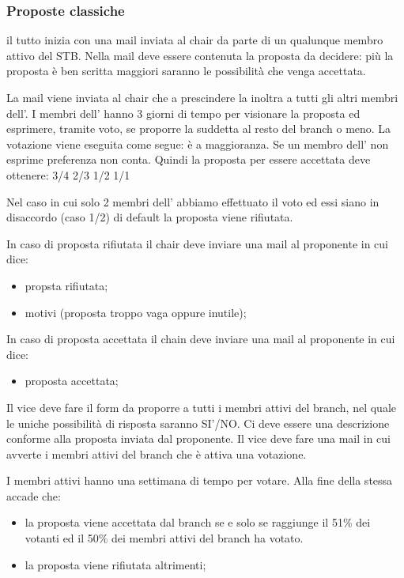 \documentclass[pdf]{article}
\theoremstyle{definition}
\begin{document}
\subsubsection{Proposte classiche}

il tutto inizia con una mail inviata al chair da parte di un qualunque membro attivo del STB. Nella mail deve essere contenuta la proposta da decidere: più la proposta è ben scritta maggiori saranno le possibilità che venga accettata. 

La mail viene inviata al chair che a prescindere la inoltra a tutti gli altri membri dell'\EC{}. I membri dell'\EC{} hanno 3 giorni di tempo per visionare la proposta ed esprimere, tramite voto, se proporre la suddetta al resto del branch o meno.
La votazione viene eseguita come segue:
è a maggioranza. Se un membro dell'\EC{} non esprime preferenza non conta. Quindi la proposta per essere accettata deve ottenere:
3/4
2/3
1/2
1/1

Nel caso in cui solo 2 membri dell'\EC{} abbiamo effettuato il voto ed essi siano in disaccordo (caso 1/2) di default la proposta viene rifiutata.

In caso di proposta rifiutata il chair deve inviare una mail al proponente in cui dice:
\begin{itemize}
	\item propsta rifiutata;
	\item motivi (proposta troppo vaga oppure inutile);
\end{itemize}

In caso di proposta accettata il chain deve inviare una mail al proponente in cui dice:
\begin{itemize}
	\item proposta accettata;
\end{itemize}

Il vice deve fare il form da proporre a tutti i membri attivi del branch, nel quale le uniche possibilità di risposta saranno SI'/NO. Ci deve essere una descrizione conforme alla proposta inviata dal proponente. 
Il vice deve fare una mail in cui avverte i membri attivi del branch che è attiva una votazione.

I membri attivi hanno una settimana di tempo per votare. Alla fine della stessa accade che:

\begin{itemize}
	\item la proposta viene accettata dal branch se e solo se raggiunge il 51\% dei votanti ed il 50\% dei membri attivi del branch ha votato.
	\item la proposta viene rifiutata altrimenti;
\end{itemize}
\end{document}
